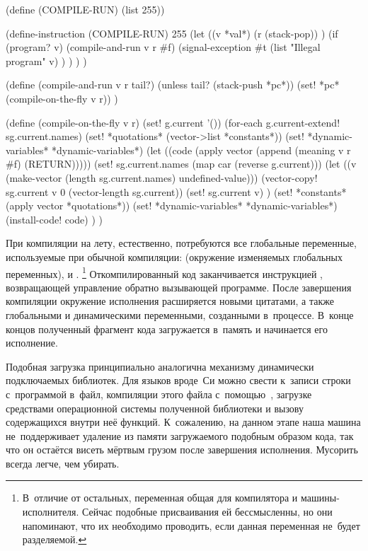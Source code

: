 \begin{code:lisp}
(define (COMPILE-RUN) (list 255))

(define-instruction (COMPILE-RUN) 255
  (let ((v *val*)
        (r (stack-pop)) )
    (if (program? v)
        (compile-and-run v r #f)
        (signal-exception #t
          (list "Illegal program" v) ) ) ) )

(define (compile-and-run v r tail?)
  (unless tail? (stack-push *pc*))
  (set! *pc* (compile-on-the-fly v r)) )

(define (compile-on-the-fly v r)
  (set! g.current '())
  (for-each g.current-extend! sg.current.names)
  (set! *quotations* (vector->list *constants*))
  (set! *dynamic-variables* *dynamic-variables*)
  (let ((code (apply vector (append (meaning v r #f) (RETURN)))))
    (set! sg.current.names (map car (reverse g.current)))
    (let ((v (make-vector (length sg.current.names) undefined-value)))
      (vector-copy! sg.current v 0 (vector-length sg.current))
      (set! sg.current v) )
    (set! *constants* (apply vector *quotations*))
    (set! *dynamic-variables* *dynamic-variables*)
    (install-code! code) ) )
\end{code:lisp}

При компиляции на лету, естественно, потребуются все глобальные переменные,
используемые при обычной компиляции:  (окружение изменяемых
глобальных переменных),  и .%
\footnote*{В~отличие от остальных, переменная  общая для
компилятора и машины-исполнителя. Сейчас подобные присваивания ей бессмысленны,
но они напоминают, что их необходимо проводить, если данная переменная не~будет
разделяемой.} Откомпилированный код заканчивается инструкцией ,
возвращающей управление обратно вызывающей программе. После завершения
компиляции окружение исполнения расширяется новыми цитатами, а также глобальными
и динамическими переменными, созданными в~процессе. В~конце концов полученный
фрагмент кода загружается в~память и начинается его исполнение.

Подобная загрузка принципиально аналогична механизму динамически подключаемых
библиотек. Для языков вроде~Си  можно свести к~записи строки
с~программой в~файл, компиляции этого файла с~помощью~, загрузке
средствами операционной системы полученной библиотеки и вызову содержащихся
внутри неё функций. К~сожалению, на данном этапе наша машина не~поддерживает
удаление из памяти загружаемого подобным образом кода, так что он остаётся
висеть мёртвым грузом после завершения исполнения. Мусорить всегда легче, чем
убирать.

